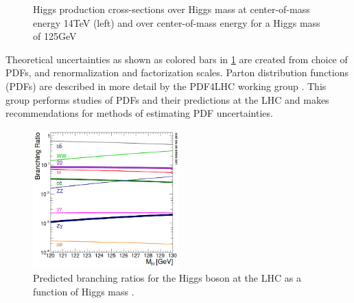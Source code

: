 \begin{figure}[H]
    \centering
    \qquad
    \caption{Higgs production cross-sections over Higgs mass at center-of-mass energy 14TeV (left) and over center-of-mass energy for a Higgs mass of 125GeV \cite{LHCCrossSectionWG}}%
    \label{fig:HiggsCrosssection}%
\end{figure}

Theoretical uncertainties as shown as colored bars in \ref{fig:HiggsCrosssection} are created from choice of PDFs, and renormalization and factorization scales. Parton distribution functions (PDFs) are described in more detail by the PDF4LHC working group \cite{PDF4LHC}. This group performs studies of PDFs and their predictions at the LHC and makes recommendations for methods of estimating PDF uncertainties. 

\begin{figure}[H]
        \centering
    \includegraphics[width=0.5\textwidth] {Pictures/HiggsBranching.png}\hspace{1cm}
    \caption{Predicted branching ratios for the Higgs boson at the LHC as a function of Higgs mass \cite{LHCCrossSectionWG}.}
    \label{fig:HiggsBR}
\end{figure}

